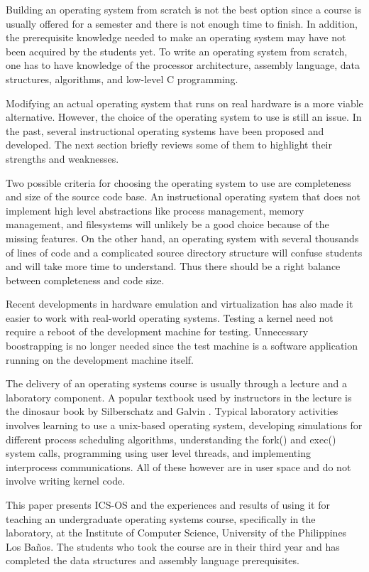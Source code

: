 \documentclass{acm_proc_article-sp}
\begin{document}
Building an operating system from scratch is not the best option since a course
is usually offered for a semester and there is not enough time to finish. In 
addition, the prerequisite knowledge needed to make an operating system may have
not been acquired by the students yet. To write an operating system from 
scratch, one has to have knowledge of the processor architecture, assembly
language, data structures, algorithms, and low-level C programming.

Modifying an actual operating system that runs on real hardware is a more
viable alternative. However, the choice of the operating system to use is
still an issue. In the past, several instructional operating systems have been
proposed and developed. The next section briefly reviews some of them 
to highlight their strengths and weaknesses.

Two possible criteria for choosing the operating system to use are completeness 
and size of the source code base. An instructional operating system that does
not implement high level abstractions like process management, memory 
management, and filesystems will unlikely be a good choice because
of the missing features. On the other hand, an operating system with several 
thousands of lines of code and a complicated source directory structure will
confuse students and will take more time to understand. Thus there should
be a right balance between completeness and code size.

Recent developments in hardware emulation and virtualization has also made it 
easier to work with real-world operating systems. Testing a kernel need not
require a reboot of the development machine for testing. Unnecessary 
boostrapping is no longer needed since the test machine is a software
application running on the development machine itself.
 
The delivery of an operating systems course is usually through a
lecture and a laboratory component. A popular textbook used by instructors in
the lecture is the dinosaur book by Silberschatz and Galvin 
\cite{silberschatz:osc}. Typical laboratory activities involves learning to 
use a unix-based operating system, developing simulations for different process
scheduling algorithms, understanding the fork() and exec() system calls, 
programming using user level threads, and implementing interprocess
communications. All of these however are in user space and do not involve 
writing kernel code.

This paper presents ICS-OS and the experiences and results of using it for 
teaching an undergraduate operating systems course, specifically in the
laboratory, at the Institute of Computer Science, University of the Philippines
Los Ba\~nos. The students who took the course are in their third year and
has completed the data structures and assembly language prerequisites.
\end{document}
